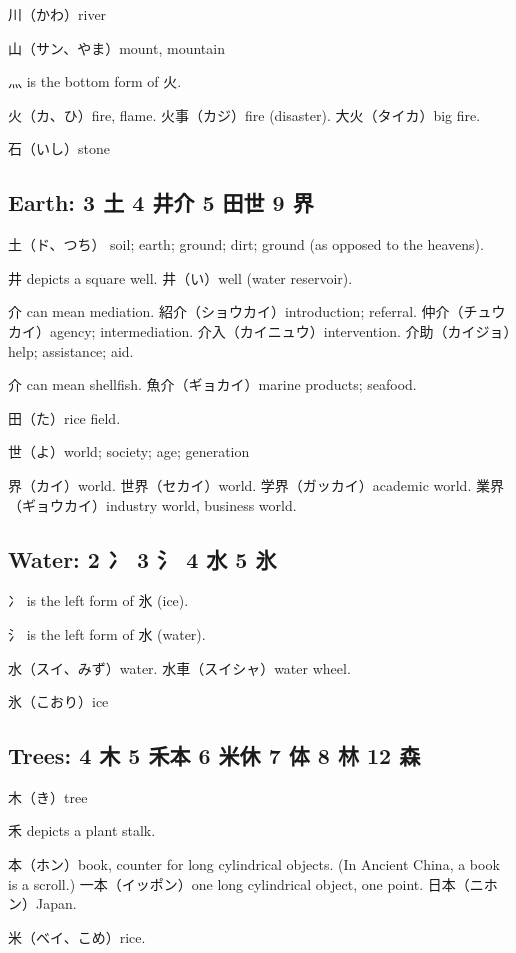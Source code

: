 川（かわ）river

山（サン、やま）mount, mountain

灬 is the bottom form of 火.

火（カ、ひ）fire, flame.
火事（カジ）fire (disaster).
大火（タイカ）big fire.

石（いし）stone

\subsection{Earth: 3 土 4 井介 5 田世 9 界}

土（ド、つち）
soil; earth; ground; dirt; ground (as opposed to the heavens).

井 depicts a square well.
井（い）well (water reservoir).

介 can mean mediation.
紹介（ショウカイ）introduction; referral.
仲介（チュウカイ）agency; intermediation.
介入（カイニュウ）intervention.
介助（カイジョ）help; assistance; aid.

介 can mean shellfish.
魚介（ギョカイ）marine products; seafood.

田（た）rice field.

世（よ）world; society; age; generation

界（カイ）world.
世界（セカイ）world.
学界（ガッカイ）academic world.
業界（ギョウカイ）industry world, business world.

\subsection{Water: 2 冫 3 氵 4 水 5 氷}

冫 is the left form of 氷 (ice).

氵 is the left form of 水 (water).

水（スイ、みず）water.
水車（スイシャ）water wheel.

氷（こおり）ice

\subsection{Trees: 4 木 5 禾本 6 米休 7 体 8 林 12 森}

木（き）tree

禾 depicts a plant stalk.

本（ホン）book, counter for long cylindrical objects.
(In Ancient China, a book is a scroll.)
一本（イッポン）one long cylindrical object, one point.
日本（ニホン）Japan.

米（ベイ、こめ）rice.


